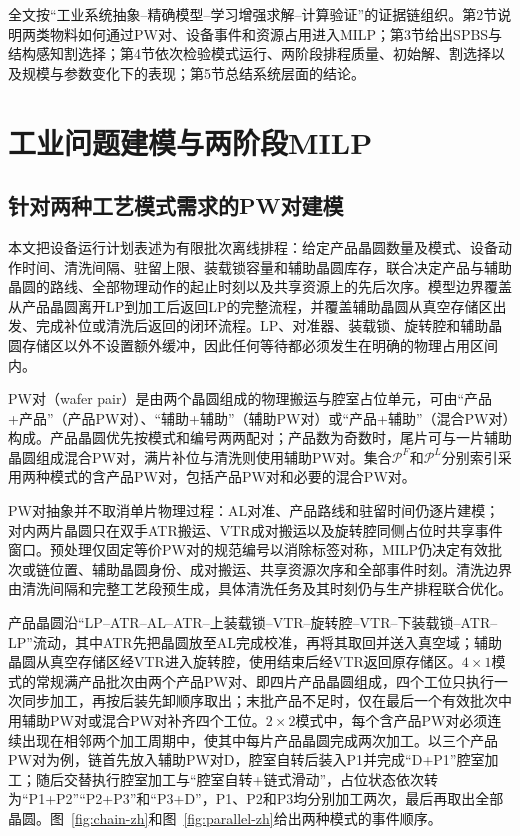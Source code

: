 \documentclass[final,5p,times,twocolumn]{elsarticle}
\begin{document}
全文按“工业系统抽象--精确模型--学习增强求解--计算验证”的证据链组织。第2节说明两类物料如何通过PW对、设备事件和资源占用进入MILP；第3节给出SPBS与结构感知割选择；第4节依次检验模式运行、两阶段排程质量、初始解、割选择以及规模与参数变化下的表现；第5节总结系统层面的结论。

\section{工业问题建模与两阶段MILP}
\setcounter{equation}{0}

\subsection{针对两种工艺模式需求的PW对建模}

本文把设备运行计划表述为有限批次离线排程：给定产品晶圆数量及模式、设备动作时间、清洗间隔、驻留上限、装载锁容量和辅助晶圆库存，联合决定产品与辅助晶圆的路线、全部物理动作的起止时刻以及共享资源上的先后次序。模型边界覆盖从产品晶圆离开LP到加工后返回LP的完整流程，并覆盖辅助晶圆从真空存储区出发、完成补位或清洗后返回的闭环流程。LP、对准器、装载锁、旋转腔和辅助晶圆存储区以外不设置额外缓冲，因此任何等待都必须发生在明确的物理占用区间内。

PW对（wafer pair）是由两个晶圆组成的物理搬运与腔室占位单元，可由“产品+产品”（产品PW对）、“辅助+辅助”（辅助PW对）或“产品+辅助”（混合PW对）构成。产品晶圆优先按模式和编号两两配对；产品数为奇数时，尾片可与一片辅助晶圆组成混合PW对，满片补位与清洗则使用辅助PW对。集合$\mathcal P^F$和$\mathcal P^L$分别索引采用两种模式的含产品PW对，包括产品PW对和必要的混合PW对。

PW对抽象并不取消单片物理过程：AL对准、产品路线和驻留时间仍逐片建模；对内两片晶圆只在双手ATR搬运、VTR成对搬运以及旋转腔同侧占位时共享事件窗口。预处理仅固定等价PW对的规范编号以消除标签对称，MILP仍决定有效批次或链位置、辅助晶圆身份、成对搬运、共享资源次序和全部事件时刻。清洗边界由清洗间隔和完整工艺段预生成，具体清洗任务及其时刻仍与生产排程联合优化。

产品晶圆沿“LP--ATR--AL--ATR--上装载锁--VTR--旋转腔--VTR--下装载锁--ATR--LP”流动，其中ATR先把晶圆放至AL完成校准，再将其取回并送入真空域；辅助晶圆从真空存储区经VTR进入旋转腔，使用结束后经VTR返回原存储区。$4\times1$模式的常规满产品批次由两个产品PW对、即四片产品晶圆组成，四个工位只执行一次同步加工，再按后装先卸顺序取出；末批产品不足时，仅在最后一个有效批次中用辅助PW对或混合PW对补齐四个工位。$2\times2$模式中，每个含产品PW对必须连续出现在相邻两个加工周期中，使其中每片产品晶圆完成两次加工。以三个产品PW对为例，链首先放入辅助PW对D，腔室自转后装入P1并完成“D+P1”腔室加工；随后交替执行腔室加工与“腔室自转+链式滑动”，占位状态依次转为“P1+P2”“P2+P3”和“P3+D”，P1、P2和P3均分别加工两次，最后再取出全部晶圆。图~\ref{fig:chain-zh}和图~\ref{fig:parallel-zh}给出两种模式的事件顺序。
\end{document}
